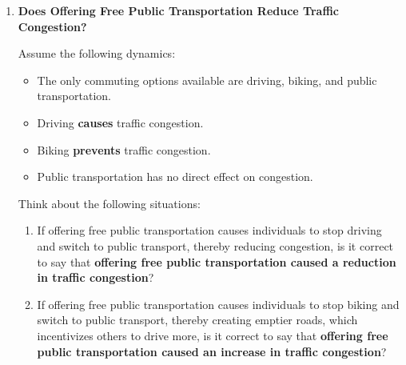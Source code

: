 \documentclass[12pt]{article}
\begin{document}
\begin{enumerate}
\begin{enumerate}[label=(\alph*)]
    \item \textbf{Confounder: Candidate Popularity} \\
    More popular candidates both attract more donations (allowing for higher spending) and are more likely to win.  
    \item \textbf{Confounder: Personal Disposition or Upbringing}  \\ 
    People inclined toward ethics may already act morally, making the relationship non-causal.  
    \item \textbf{Confounder: Government Strength}  \\
    Stronger governments may both engage in censorship and maintain stability, creating a spurious correlation.  
    \item \textbf{Confounder: Education Level}  \\
    Higher education levels may increase both reading literary fiction and empathy, explaining the observed effect.  
    \item \textbf{Assumptions for no confounders between Voter Turnout and Inequality} \\
    If we compare voter turnout within the same country over a short period, political culture and institutions remain constant, making it plausible that economic inequality is the primary driver of differences in turnout.  
\end{enumerate}

\fi \color{black}

\item \textbf{Does Offering Free Public Transportation Reduce Traffic Congestion?}

Assume the following dynamics:
\begin{itemize}[noitemsep]
    \item The only commuting options available are driving, biking, and public transportation.
    \item Driving \textbf{causes} traffic congestion.
    \item Biking \textbf{prevents} traffic congestion.
    \item Public transportation has no direct effect on congestion.
\end{itemize}

Think about the following situations:
\begin{enumerate}[label=(\roman*)]
    \item If offering free public transportation causes individuals to stop driving and switch to public transport, thereby reducing congestion, is it correct to say that \textbf{offering free public transportation caused a reduction in traffic congestion}?
    \item If offering free public transportation causes individuals to stop biking and switch to public transport, thereby creating emptier roads, which incentivizes others to drive more, is it correct to say that \textbf{offering free public transportation caused an increase in traffic congestion}?
\end{enumerate}


\end{enumerate}
\end{document}
